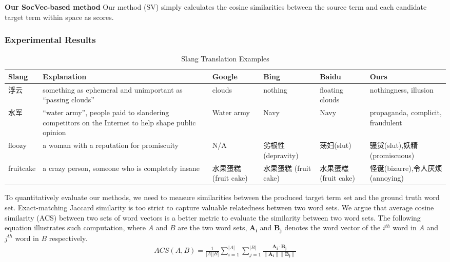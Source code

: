 \textbf{{Our SocVec-based method}} Our method (SV) simply calculates the cosine similarities between the source term and each candidate target term within \textit{\socvec} space as scores.

\subsubsection{Experimental Results}
\begin{table*}[th!]
	\small
	\centering
	\caption{Slang Translation Examples}
	\begin{tabular}{|L{1.2cm}|L{4.7cm}|L{1.7cm}|L{1.7cm}|L{1.7cm}|L{2.8cm}|}
		\hline
		\textbf{Slang} & \textbf{Explanation} & \textbf{Google}& \textbf{Bing}& \textbf{Baidu} & \textbf{Ours} \\ \hline \hline
		浮云 &something as ephemeral and unimportant as ``passing clouds''& clouds& nothing& floating clouds & nothingness, illusion \\ \hline
		水军 &``water army'', people paid to slandering competitors on the Internet to help shape public opinion& Water army& Navy& Navy & propaganda, complicit, fraudulent\\ \hline
		floozy & a woman with a reputation for promiscuity & N/A&劣根性 (depravity)&荡妇(slut)&骚货(slut),妖精(promiscuous)\\ \hline
		fruitcake& a crazy person, someone who is completely insane & 水果蛋糕 \quad(fruit cake)&水果蛋糕 \qquad(fruit cake)&水果蛋糕 \quad(fruit cake)& 怪诞(bizarre),令人厌烦(annoying)\\ \hline
	\end{tabular}
	\label{tab:bleis_3}
\end{table*}
To quantitatively evaluate our methods, we need to measure similarities between the produced target term set and the ground truth word set. 
Exact-matching Jaccard similarity is too strict to capture valuable relatedness between two word sets.
We argue that average cosine similarity (ACS) between two sets of word vectors is a better metric to evaluate the similarity between two word sets. The following equation illustrates such computation, where $A$ and $B$ are the two word sets, $\mathbf{A_i}$ and $\mathbf{B_j}$ denotes the word vector of the $i^{th}$ word in $A$ and $j^{th}$ word in $B$ respectively. 
\begin{align*}
ACS (A,B)=
{\frac{1}{|A||B|}}{\sum_{i=1}^{|A|}{\sum_{j=1}^{|B|}} \frac{\mathbf{A_i }\cdot \mathbf{B_j}}{\|\mathbf{A_i }\|\|\mathbf{B_j }\|}}
\end{align*}

